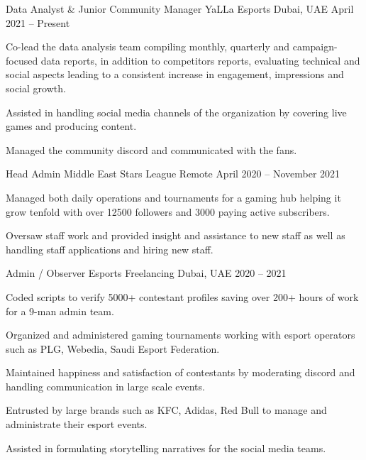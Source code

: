 \documentclass[]{awesome-cv}
\begin{document}
\vspace{-2mm}
\begin{cventries}

	\cventry
	{Data Analyst \& Junior Community Manager}
	{YaLLa Esports}
	{Dubai, UAE}
	{April 2021 – Present}
	{\begin{cvitems}
		\item {Co-lead the data analysis team compiling monthly, quarterly and campaign-focused data reports, in addition to competitors reports, evaluating technical and social aspects leading to a consistent increase in engagement, impressions and social growth.}
		\item {Assisted in handling social media channels of the organization by covering live games and producing content.}
		\item {Managed the community discord and communicated with the fans.}
		\end{cvitems}}
		\vspace{1mm}
	\cventry
	{Head Admin}
	{Middle East Stars League}
	{Remote}
	{April 2020 – November 2021}
	{\begin{cvitems}
		\item {Managed both daily operations and tournaments for a gaming hub helping it grow tenfold with over 12500 followers and 3000 paying active subscribers.}
		\item {Oversaw staff work and provided insight and assistance to new staff as well as handling staff applications and hiring new staff.}
		\end{cvitems}}

	\vspace{1mm}

	\cventry
	{Admin / Observer}
	{Esports Freelancing}
	{Dubai, UAE}
	{2020 – 2021}
	{\begin{cvitems}
		\item {Coded scripts to verify 5000+ contestant profiles saving over 200+ hours of work for a 9-man admin team.}
		\item {Organized and administered gaming tournaments working with esport operators such as PLG, Webedia, Saudi Esport Federation.}
		\item {Maintained happiness and satisfaction of contestants by moderating discord and handling communication in large scale events.}
		\item {Entrusted by large brands such as KFC, Adidas, Red Bull to manage and administrate their esport events.}
		\item {Assisted in formulating storytelling narratives for the social media teams.}
		\end{cvitems}}
\end{cventries}



\ 
\end{document}
